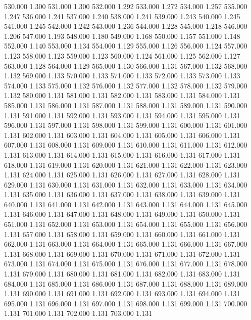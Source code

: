 530.000 1.300 
531.000 1.300 
532.000 1.292 
533.000 1.272 
534.000 1.257 
535.000 1.247 
536.000 1.241 
537.000 1.240 
538.000 1.241 
539.000 1.243 
540.000 1.245 
541.000 1.245 
542.000 1.242 
543.000 1.236 
544.000 1.228 
545.000 1.218 
546.000 1.206 
547.000 1.193 
548.000 1.180 
549.000 1.168 
550.000 1.157 
551.000 1.148 
552.000 1.140 
553.000 1.134 
554.000 1.129 
555.000 1.126 
556.000 1.124 
557.000 1.123 
558.000 1.123 
559.000 1.123 
560.000 1.124 
561.000 1.125 
562.000 1.127 
563.000 1.128 
564.000 1.129 
565.000 1.130 
566.000 1.131 
567.000 1.132 
568.000 1.132 
569.000 1.133 
570.000 1.133 
571.000 1.133 
572.000 1.133 
573.000 1.133 
574.000 1.133 
575.000 1.132 
576.000 1.132 
577.000 1.132 
578.000 1.132 
579.000 1.132 
580.000 1.131 
581.000 1.131 
582.000 1.131 
583.000 1.131 
584.000 1.131 
585.000 1.131 
586.000 1.131 
587.000 1.131 
588.000 1.131 
589.000 1.131 
590.000 1.131 
591.000 1.131 
592.000 1.131 
593.000 1.131 
594.000 1.131 
595.000 1.131 
596.000 1.131 
597.000 1.131 
598.000 1.131 
599.000 1.131 
600.000 1.131 
601.000 1.131 
602.000 1.131 
603.000 1.131 
604.000 1.131 
605.000 1.131 
606.000 1.131 
607.000 1.131 
608.000 1.131 
609.000 1.131 
610.000 1.131 
611.000 1.131 
612.000 1.131 
613.000 1.131 
614.000 1.131 
615.000 1.131 
616.000 1.131 
617.000 1.131 
618.000 1.131 
619.000 1.131 
620.000 1.131 
621.000 1.131 
622.000 1.131 
623.000 1.131 
624.000 1.131 
625.000 1.131 
626.000 1.131 
627.000 1.131 
628.000 1.131 
629.000 1.131 
630.000 1.131 
631.000 1.131 
632.000 1.131 
633.000 1.131 
634.000 1.131 
635.000 1.131 
636.000 1.131 
637.000 1.131 
638.000 1.131 
639.000 1.131 
640.000 1.131 
641.000 1.131 
642.000 1.131 
643.000 1.131 
644.000 1.131 
645.000 1.131 
646.000 1.131 
647.000 1.131 
648.000 1.131 
649.000 1.131 
650.000 1.131 
651.000 1.131 
652.000 1.131 
653.000 1.131 
654.000 1.131 
655.000 1.131 
656.000 1.131 
657.000 1.131 
658.000 1.131 
659.000 1.131 
660.000 1.131 
661.000 1.131 
662.000 1.131 
663.000 1.131 
664.000 1.131 
665.000 1.131 
666.000 1.131 
667.000 1.131 
668.000 1.131 
669.000 1.131 
670.000 1.131 
671.000 1.131 
672.000 1.131 
673.000 1.131 
674.000 1.131 
675.000 1.131 
676.000 1.131 
677.000 1.131 
678.000 1.131 
679.000 1.131 
680.000 1.131 
681.000 1.131 
682.000 1.131 
683.000 1.131 
684.000 1.131 
685.000 1.131 
686.000 1.131 
687.000 1.131 
688.000 1.131 
689.000 1.131 
690.000 1.131 
691.000 1.131 
692.000 1.131 
693.000 1.131 
694.000 1.131 
695.000 1.131 
696.000 1.131 
697.000 1.131 
698.000 1.131 
699.000 1.131 
700.000 1.131 
701.000 1.131 
702.000 1.131 
703.000 1.131 
